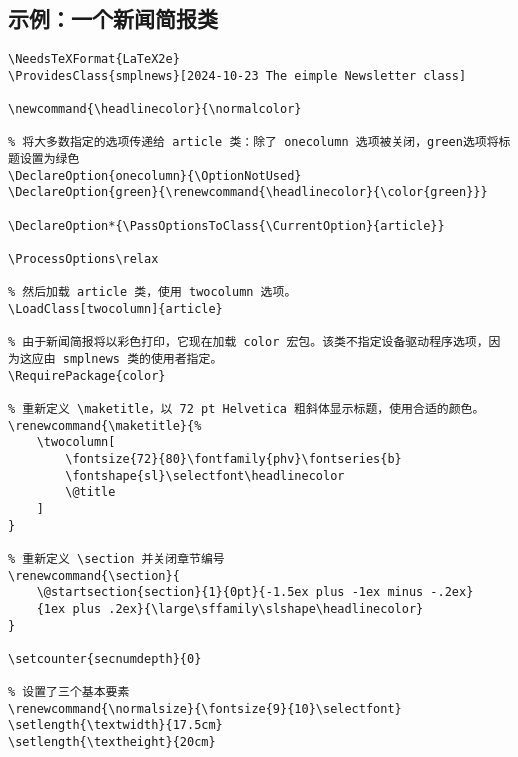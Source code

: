 \subsection{示例：一个新闻简报类}\label{subsec:cls-news}
\begin{lstlisting}
\NeedsTeXFormat{LaTeX2e}
\ProvidesClass{smplnews}[2024-10-23 The eimple Newsletter class]

\newcommand{\headlinecolor}{\normalcolor}

% 将大多数指定的选项传递给 article 类：除了 onecolumn 选项被关闭，green选项将标题设置为绿色
\DeclareOption{onecolumn}{\OptionNotUsed}
\DeclareOption{green}{\renewcommand{\headlinecolor}{\color{green}}}

\DeclareOption*{\PassOptionsToClass{\CurrentOption}{article}}

\ProcessOptions\relax

% 然后加载 article 类，使用 twocolumn 选项。
\LoadClass[twocolumn]{article}

% 由于新闻简报将以彩色打印，它现在加载 color 宏包。该类不指定设备驱动程序选项，因为这应由 smplnews 类的使用者指定。
\RequirePackage{color}

% 重新定义 \maketitle，以 72 pt Helvetica 粗斜体显示标题，使用合适的颜色。
\renewcommand{\maketitle}{%
    \twocolumn[
        \fontsize{72}{80}\fontfamily{phv}\fontseries{b}
        \fontshape{sl}\selectfont\headlinecolor
        \@title
    ]
}

% 重新定义 \section 并关闭章节编号
\renewcommand{\section}{
    \@startsection{section}{1}{0pt}{-1.5ex plus -1ex minus -.2ex}
    {1ex plus .2ex}{\large\sffamily\slshape\headlinecolor}
}

\setcounter{secnumdepth}{0}

% 设置了三个基本要素
\renewcommand{\normalsize}{\fontsize{9}{10}\selectfont}
\setlength{\textwidth}{17.5cm}
\setlength{\textheight}{20cm}
\end{lstlisting}